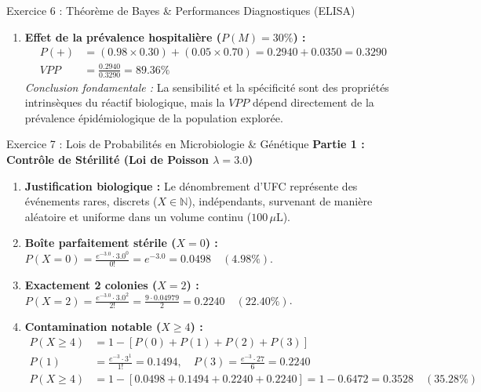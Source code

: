 \documentclass[11pt,a4paper]{article}
\begin{document}
\begin{solutionbox}{Exercice 6 : Théorème de Bayes \& Performances Diagnostiques (ELISA)}
\begin{enumerate}[label=\textbf{\alph*.}]
  \item \textbf{Effet de la prévalence hospitalière ($P(M) = 30\%$) :}
  \begin{align*}
    P(+) &= (0.98 \times 0.30) + (0.05 \times 0.70) = 0.2940 + 0.0350 = 0.3290 \\
    VPP &= \frac{0.2940}{0.3290} = \mathbf{89.36\%}
  \end{align*}
  \textit{Conclusion fondamentale :} La sensibilité et la spécificité sont des propriétés intrinsèques du réactif biologique, mais la $VPP$ dépend directement de la prévalence épidémiologique de la population explorée.
\end{enumerate}
\end{solutionbox}

\begin{solutionbox}{Exercice 7 : Lois de Probabilités en Microbiologie \& Génétique}
\textbf{Partie 1 : Contrôle de Stérilité (Loi de Poisson $\lambda = 3.0$)}
\begin{enumerate}[label=\textbf{\alph*.}]
  \item \textbf{Justification biologique :} Le dénombrement d'UFC représente des événements rares, discrets ($X \in \mathbb{N}$), indépendants, survenant de manière aléatoire et uniforme dans un volume continu ($100\,\mu\text{L}$).
  \item \textbf{Boîte parfaitement stérile ($X = 0$) :}
  $P(X = 0) = \frac{e^{-3.0} \cdot 3.0^0}{0!} = e^{-3.0} = \mathbf{0.0498 \quad (4.98\%)}$.
  \item \textbf{Exactement 2 colonies ($X = 2$) :}
  $P(X = 2) = \frac{e^{-3.0} \cdot 3.0^2}{2!} = \frac{9 \cdot 0.04979}{2} = \mathbf{0.2240 \quad (22.40\%)}$.
  \item \textbf{Contamination notable ($X \ge 4$) :}
  \begin{align*}
    P(X \ge 4) &= 1 - [P(0) + P(1) + P(2) + P(3)] \\
    P(1) &= \frac{e^{-3} \cdot 3^1}{1!} = 0.1494, \quad P(3) = \frac{e^{-3} \cdot 27}{6} = 0.2240 \\
    P(X \ge 4) &= 1 - [0.0498 + 0.1494 + 0.2240 + 0.2240] = 1 - 0.6472 = \mathbf{0.3528 \quad (35.28\%)}
  \end{align*}
\end{enumerate}


\end{solutionbox}
\end{document}
